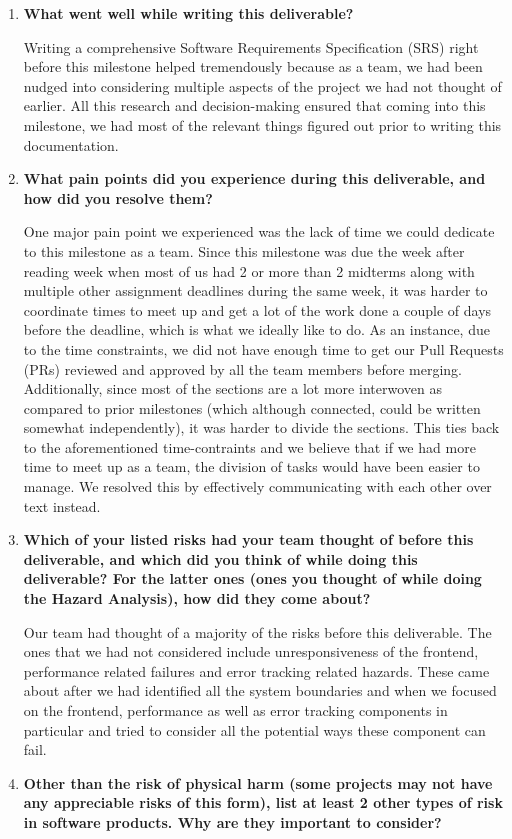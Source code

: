 \documentclass{article}
\begin{document}
\begin{enumerate}
    \item \textbf{What went well while writing this deliverable?}
    
    Writing a comprehensive Software Requirements Specification (SRS) right before this milestone
    helped tremendously because as a team, we had been nudged into considering multiple aspects
    of the project we had not thought of earlier. All this research and decision-making ensured
    that coming into this milestone, we had most of the relevant things figured out prior to writing
    this documentation.
    \newline
    \item \textbf{What pain points did you experience during this deliverable, and how
    did you resolve them?}
    
    One major pain point we experienced was the lack of time we could dedicate to this milestone as
    a team. Since this milestone was due the week after reading week when most of us had 2 or more than 2 midterms along
    with multiple other assignment deadlines during the same week, it was harder to coordinate times to meet up and get a lot of the work done
    a couple of days before the deadline, which is what we ideally like to do. As an instance, due to the time constraints, 
    we did not have enough time to get our Pull Requests (PRs) reviewed and approved by all the team members before merging.\\
    \newline
    Additionally, since most of the sections are a lot more interwoven as compared to prior milestones (which although connected,
    could be written somewhat independently), it was harder to divide the sections. This ties back to the aforementioned 
    time-contraints and we believe that if we had more time to meet up as a team, the division of tasks would have been easier
    to manage.  We resolved this by effectively communicating with each other over text instead.
    \newline
    \item \textbf{Which of your listed risks had your team thought of before this
    deliverable, and which did you think of while doing this deliverable? For
    the latter ones (ones you thought of while doing the Hazard Analysis), how
    did they come about?}

    Our team had thought of a majority of the risks before this deliverable. The ones that we had not
    considered include unresponsiveness of the frontend, performance related failures and error tracking related hazards.
    These came about after we had identified all the system boundaries and when we focused on the frontend, performance as well as error tracking 
    components in particular and tried to consider all the potential ways these component can fail.
    \newline
    \item \textbf{Other than the risk of physical harm (some projects may not have any
    appreciable risks of this form), list at least 2 other types of risk in
    software products. Why are they important to consider?}


\end{enumerate}
\end{document}
